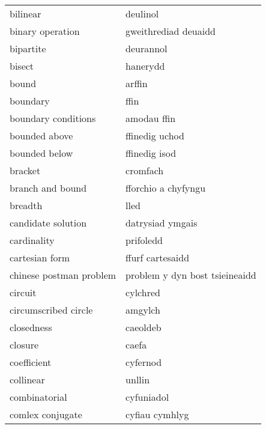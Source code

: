 \begin{supertabular}{p{0.22\textwidth}p{0.22\textwidth}}
                        bilinear &                        deulinol \\
                binary operation &            gweithrediad deuaidd \\
                       bipartite &                       deurannol \\
                          bisect &                        hanerydd \\
                           bound &                          arffin \\
                        boundary &                            ffin \\
             boundary conditions &                     amodau ffin \\
                   bounded above &                  ffinedig uchod \\
                   bounded below &                   ffinedig isod \\
                         bracket &                        cromfach \\
                branch and bound &             fforchio a chyfyngu \\
                         breadth &                            lled \\
              candidate solution &                datrysiad ymgais \\
                     cardinality &                       prifoledd \\
                  cartesian form &                ffurf cartesaidd \\
         chinese postman problem &  problem y dyn bost tsieineaidd \\
                         circuit &                        cylchred \\
            circumscribed circle &                         amgylch \\
                      closedness &                        caeoldeb \\
                         closure &                           caefa \\
                     coefficient &                        cyfernod \\
                       collinear &                          unllin \\
                   combinatorial &                      cyfuniadol \\
                comlex conjugate &                  cyfiau cymhlyg \\

\end{supertabular}
